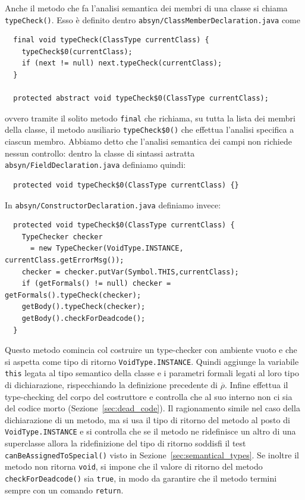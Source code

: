 Anche il metodo che fa l'analisi semantica dei membri di una classe si
chiama \texttt{typeCheck()}. Esso \`e definito dentro
\texttt{absyn/ClassMemberDeclaration.java} come
%
\begin{verbatim}
  final void typeCheck(ClassType currentClass) {
    typeCheck$0(currentClass);
    if (next != null) next.typeCheck(currentClass);
  }

  protected abstract void typeCheck$0(ClassType currentClass);
\end{verbatim}
ovvero tramite il solito metodo \texttt{final} che richiama, su tutta la
lista dei membri della classe, il metodo ausiliario
\texttt{typeCheck\$0()} che effettua l'analisi specifica a ciascun membro.
Abbiamo detto che l'analisi semantica dei campi non richiede nessun controllo:
dentro la classe di sintassi astratta
\texttt{absyn/FieldDeclaration.java} definiamo quindi:
%
\begin{verbatim}
  protected void typeCheck$0(ClassType currentClass) {}
\end{verbatim}
In \texttt{absyn/ConstructorDeclaration.java} definiamo invece:
%
\begin{verbatim}
  protected void typeCheck$0(ClassType currentClass) {
    TypeChecker checker
      = new TypeChecker(VoidType.INSTANCE, currentClass.getErrorMsg());
    checker = checker.putVar(Symbol.THIS,currentClass);
    if (getFormals() != null) checker = getFormals().typeCheck(checker);
    getBody().typeCheck(checker);
    getBody().checkForDeadcode();
  }
\end{verbatim}
Questo metodo comincia col costruire un type-checker con ambiente vuoto e
che si aspetta come tipo di ritorno \texttt{VoidType.INSTANCE}. Quindi aggiunge
la variabile \texttt{this} legata al tipo semantico
della classe e i parametri formali legati al loro tipo di dichiarazione,
rispecchiando la definizione precedente di $\overline{\rho}$.
Infine effettua il type-checking del corpo del costruttore e controlla che al
suo interno non ci sia del codice morto (Sezione~\ref{sec:dead_code}).
Il ragionamento \e simile nel caso della dichiarazione di un metodo,
ma si usa il tipo di ritorno del metodo al posto di \texttt{VoidType.INSTANCE} e si
controlla che se il metodo ne ridefinisce un
altro di una superclasse allora la ridefinizione del tipo di ritorno
soddisfi il test \texttt{canBeAssignedToSpecial()}
visto in Sezione~\ref{sec:semantical_types}. Se inoltre il metodo non
ritorna \texttt{void}, si impone che il valore di ritorno del metodo
\texttt{checkForDeadcode()} sia \texttt{true}, in modo da garantire che
il metodo termini sempre con un comando \texttt{return}.

